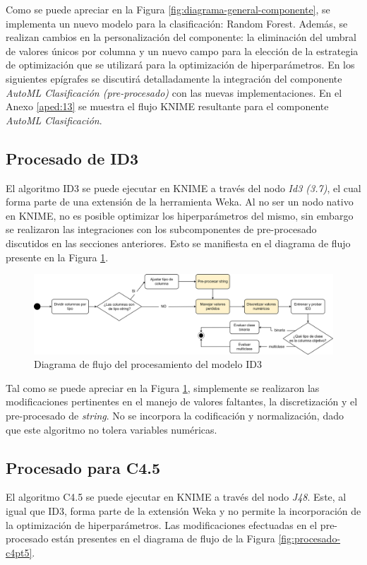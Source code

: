 Como se puede apreciar en la Figura \ref{fig:diagrama-general-componente}, se implementa un nuevo modelo para la clasificación: Random Forest. Además, se realizan cambios en la personalización del componente: la eliminación del umbral de valores únicos por columna y un nuevo campo para la elección de la estrategia de optimización que se utilizará para la optimización de hiperparámetros. En los siguientes epígrafes se discutirá detalladamente la integración del componente \textit{AutoML Clasificación (pre-procesado)} con las nuevas implementaciones. En el Anexo \ref{aped:13} se muestra el flujo KNIME resultante para el componente \textit{AutoML Clasificación}.

\subsection{Procesado de ID3}
El algoritmo ID3 se puede ejecutar en KNIME a través del nodo \textit{Id3 (3.7)}, el cual forma parte de una extensión de la herramienta Weka. Al no ser un nodo nativo en KNIME, no es posible optimizar los hiperparámetros del mismo, sin embargo se realizaron las integraciones con los subcomponentes de pre-procesado discutidos en las secciones anteriores. Esto se manifiesta en el diagrama de flujo presente en la Figura \ref{fig:procesado-id3}.

\begin{figure}[H]
	\centering
	\includegraphics[width=0.9\linewidth]{"figuras/capi 2/modelos/procesado id3.drawio"}
	\caption{Diagrama de flujo del procesamiento del modelo ID3}
	\label{fig:procesado-id3}
\end{figure}

Tal como se puede apreciar en la Figura \ref{fig:procesado-id3}, simplemente se realizaron las modificaciones pertinentes en el manejo de valores faltantes, la discretización y el pre-procesado de \textit{string}. No se incorpora la codificación y normalización, dado que este algoritmo no tolera variables numéricas.

\subsection{Procesado para C4.5}
El algoritmo C4.5 se puede ejecutar en KNIME a través del nodo \textit{J48}. Este, al igual que ID3, forma parte de la extensión Weka y no permite la incorporación de la optimización de hiperparámetros. Las modificaciones efectuadas en el pre-procesado están presentes en el diagrama de flujo de la Figura \ref{fig:procesado-c4pt5}.

